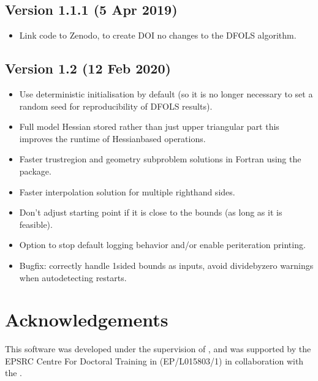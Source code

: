 \documentclass[letterpaper,10pt,english]{sphinxmanual}
\begin{document}
\section{Version 1.1.1 (5 Apr 2019)}
\label{\detokenize{history:version-1-1-1-5-apr-2019}}\begin{itemize}
\item {} 
Link code to Zenodo, to create DOI \sphinxhyphen{} no changes to the DFO\sphinxhyphen{}LS algorithm.

\end{itemize}


\section{Version 1.2 (12 Feb 2020)}
\label{\detokenize{history:version-1-2-12-feb-2020}}\begin{itemize}
\item {} 
Use deterministic initialisation by default (so it is no longer necessary to set a random seed for reproducibility of DFO\sphinxhyphen{}LS results).

\item {} 
Full model Hessian stored rather than just upper triangular part \sphinxhyphen{} this improves the runtime of Hessian\sphinxhyphen{}based operations.

\item {} 
Faster trust\sphinxhyphen{}region and geometry subproblem solutions in Fortran using the  package.

\item {} 
Faster interpolation solution for multiple right\sphinxhyphen{}hand sides.

\item {} 
Don’t adjust starting point if it is close to the bounds (as long as it is feasible).

\item {} 
Option to stop default logging behavior and/or enable per\sphinxhyphen{}iteration printing.

\item {} 
Bugfix: correctly handle 1\sphinxhyphen{}sided bounds as inputs, avoid divide\sphinxhyphen{}by\sphinxhyphen{}zero warnings when auto\sphinxhyphen{}detecting restarts.

\end{itemize}


\chapter{Acknowledgements}
\label{\detokenize{index:acknowledgements}}
This software was developed under the supervision of , and was supported by the EPSRC Centre For Doctoral Training in  (EP/L015803/1) in collaboration with the .
\end{document}
